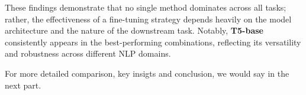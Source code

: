 These findings demonstrate that no single method dominates across all tasks; rather, the effectiveness of a fine-tuning strategy depends heavily on the model architecture and the nature of the downstream task. Notably, \textbf{T5-base} consistently appears in the best-performing combinations, reflecting its versatility and robustness across different NLP domains.

For more detailed comparison, key insigts and conclusion, we would say in the next part.

\newpage 
